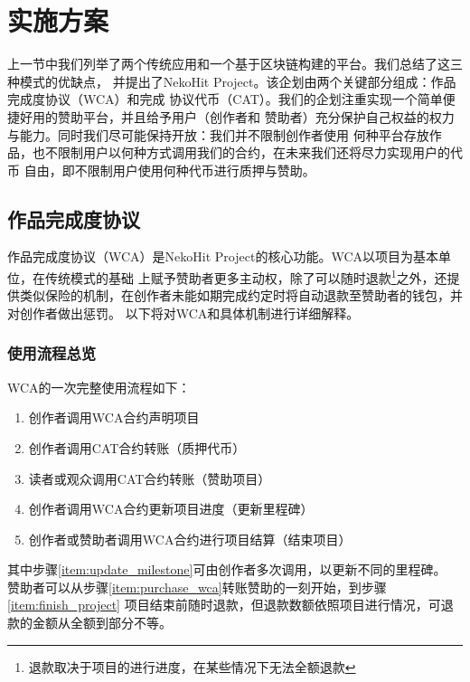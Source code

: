 \documentclass[11pt,UTF8,a4paper]{ctexart}
\begin{document}
    \section{实施方案}\label{sec:solution}

    上一节中我们列举了两个传统应用和一个基于区块链构建的平台。我们总结了这三种模式的优缺点，
    并提出了NekoHit Project。该企划由两个关键部分组成：作品完成度协议（WCA）和完成
    协议代币（CAT）。我们的企划注重实现一个简单便捷好用的赞助平台，并且给予用户（创作者和
    赞助者）充分保护自己权益的权力与能力。同时我们尽可能保持开放：我们并不限制创作者使用
    何种平台存放作品，也不限制用户以何种方式调用我们的合约，在未来我们还将尽力实现用户的代币
    自由，即不限制用户使用何种代币进行质押与赞助。

    \subsection{作品完成度协议}\label{subsec:wca}

    作品完成度协议（WCA）是NekoHit Project的核心功能。WCA以项目为基本单位，在传统模式的基础
    上赋予赞助者更多主动权，除了可以随时退款\footnote{
        退款取决于项目的进行进度，在某些情况下无法全额退款
    }之外，还提供类似保险的机制，在创作者未能如期完成约定时将自动退款至赞助者的钱包，并对创作者做出惩罚。
    以下将对WCA和具体机制进行详细解释。

    \subsubsection{使用流程总览}

    WCA的一次完整使用流程如下：

    \begin{enumerate}
        \item 创作者调用WCA合约声明项目
        \item 创作者调用CAT合约转账（质押代币）
        \item 读者或观众调用CAT合约转账（赞助项目）\label{item:purchase_wca}
        \item 创作者调用WCA合约更新项目进度（更新里程碑）\label{item:update_milestone}
        \item 创作者或赞助者调用WCA合约进行项目结算（结束项目）\label{item:finish_project}
    \end{enumerate}

    其中步骤\ref{item:update_milestone}可由创作者多次调用，以更新不同的里程碑。
    赞助者可以从步骤\ref{item:purchase_wca}转账赞助的一刻开始，到步骤\ref{item:finish_project}
    项目结束前随时退款，但退款数额依照项目进行情况，可退款的金额从全额到部分不等。
\end{document}
